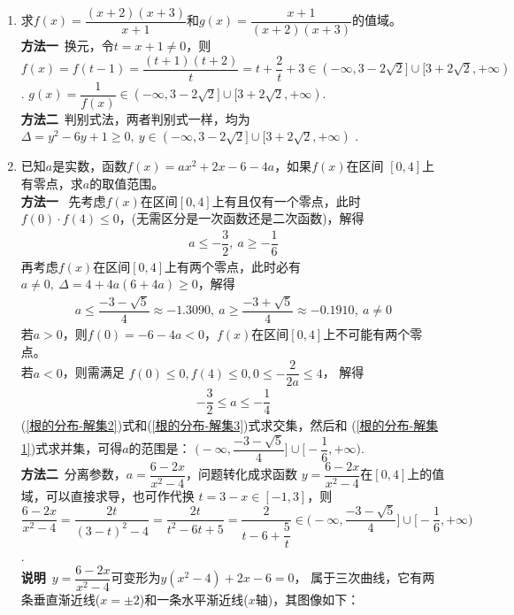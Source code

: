 \begin{enumerate}[label={【\textbf{例\thechapter.\arabic*}】},
 leftmargin=\inteval{\myenumleftmargin}pt,
 itemsep=\inteval{\myenumitempsep}pt,
 itemindent=\inteval{\myenumitemindent}pt]
\item 求$ f(x)=\dfrac{(x+2)(x+3)}{x+1} $和$ g(x)=\dfrac{x+1}{(x+2)(x+3)} $的值域。\\
\textbf{方法一}\ 换元，令$ t=x+1\neq 0 $，则$ f(x)=f(t-1)=\dfrac{(t+1)(t+2)}{t}=t+
\dfrac{2}{t}+3\in (-\infty,3-2\sqrt{2}]\cup [3+2\sqrt{2},+\infty) $. 
$ g(x)=\dfrac{1}{f(x)}\in (-\infty,3-2\sqrt{2}]\cup [3+2\sqrt{2},+\infty) $. \\
\textbf{方法二}\ 判别式法，两者判别式一样，均为$ \Delta=y^2-6y+1\geq 0,\ y
\in (-\infty,3-2\sqrt{2}]\cup [3+2\sqrt{2},+\infty) $ .

\item 已知$ a $是实数，函数$ f(x)=ax^2+2x-6-4a $，如果$ f(x) $在区间
$ [0,4] $上有零点，求$ a $的取值范围。 \\
\textbf{方法一}\ 
 先考虑$ f(x) $在区间$ [0,4] $上有且仅有一个零点，此时$ f(0)\cdot 
f(4)\leq 0 $，(无需区分是一次函数还是二次函数)，解得
\begin{gather} \label{根的分布-解集1}
    a\leq -\dfrac{3}{2},\ a\geq -\dfrac{1}{6}
\end{gather}
 再考虑$ f(x) $在区间$ [0,4] $上有两个零点，此时必有
$ a\neq 0,\ \Delta=4+4a(6+4a)\geq 0 $，解得
\begin{gather} \label{根的分布-解集2}
    a\leq\dfrac{-3-\sqrt{5}}{4}\approx -1.3090,\ a\geq\dfrac{-3+\sqrt{5}}{4}
    \approx -0.1910,\ a\neq 0
\end{gather}
若$ a>0 $，则$ f(0)=-6-4a<0 $，$ f(x) $在区间$ [0,4] $上不可能有两个零点。\\
若$ a<0 $，则需满足 $ f(0)\leq 0, f(4)\leq 0, 0\leq -\dfrac{2}{2a} \leq 4 $，
解得
\begin{gather} \label{根的分布-解集3}
    -\dfrac{3}{2} \leq a \leq -\dfrac{1}{4}
\end{gather}
(\ref{根的分布-解集2})式和(\ref{根的分布-解集3})式求交集，然后和
(\ref{根的分布-解集1})式求并集，可得$ a $的范围是：
$ \Big(-\infty,\dfrac{-3-\sqrt{5}}{4}\Big]\cup 
\Big[-\dfrac{1}{6},+\infty \Big) $. 
\\ 
\textbf{方法二}\ 分离参数，$ a=\dfrac{6-2x}{x^2-4} $，问题转化成求函数
$ y=\dfrac{6-2x}{x^2-4} $在$ [0,4] $上的值域，可以直接求导，也可作代换
$ t=3-x\in[-1,3] $，则$ \dfrac{6-2x}{x^2-4}=\dfrac{2t}{(3-t)^2-4}=
\dfrac{2t}{t^2-6t+5}=\dfrac{2}{t-6+\dfrac{5}{t}} \in 
\Big(-\infty,\dfrac{-3-\sqrt{5}}{4}\Big]\cup 
\Big[-\dfrac{1}{6},+\infty \Big) $. \\
\textbf{说明}\ $ y=\dfrac{6-2x}{x^2-4} $可变形为$ y(x^2-4)+2x-6=0 $，
属于三次曲线，它有两条垂直渐近线($ x=\pm 2 $)和一条水平渐近线($ x $轴)，其图像如下：

\end{enumerate}
